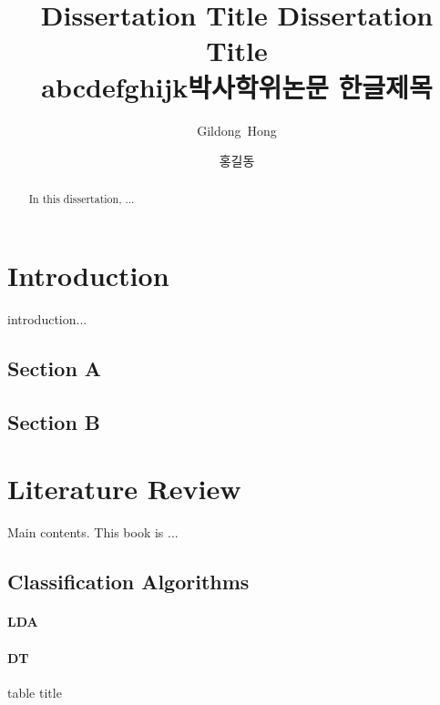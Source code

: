 \documentclass[twoside,phd]{snuthesis_utf8}
\title{Dissertation Title Dissertation Title \\abcdefghijk}
\title*{박사학위논문 한글제목}
\author{Gildong~Hong}
\author*{홍길동} %
\begin{document}
\makefrontcover
\makeapproval

\cleardoublepage
\makeagreement

\cleardoublepage
{}

\begin{abstract}
In this dissertation, ...

\end{abstract}
\cleardoublepage

\tableofcontents
{}
\cleardoublepage

\listoftables
{}
\cleardoublepage

\listoffigures
{}
\cleardoublepage


\chapter{Introduction}

introduction...

\section{Section A}
\section{Section B}


\chapter{Literature Review}
Main contents.
This book \cite{bishop2006} is ...

\section{Classification Algorithms}

\subsubsection{LDA}
\subsubsection{DT}

\begin{table}[!hbp]
\caption{table title}
\end{table}
\end{document}
